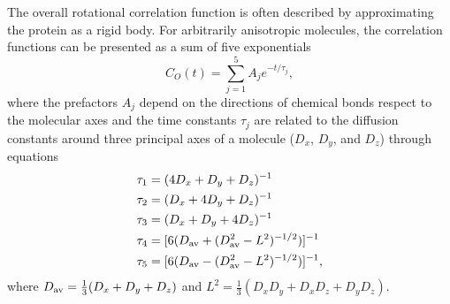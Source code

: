 \documentclass[journal=jpcbfk,manuscript=article]{achemso}
\providecommand{\DIFaddbegin}{} %
\providecommand{\DIFaddend}{} %
\providecommand{\DIFdelbegin}{} %
\providecommand{\DIFdelend}{} %
\begin{document}
The overall rotational correlation function is often described
by approximating the protein as a rigid body.
For arbitrarily anisotropic molecules, the correlation functions
can  be presented as a sum of five exponentials~\cite{woessner62,korzhnev01}
\begin{equation}\label{CORRFanisot}
  C_O(t)=\sum_{j=1}^5 A_j e^{-t/\tau_j},
\end{equation}
where the prefactors $A_j$ depend on the directions of chemical bonds 
respect to the molecular axes \cite{woessner62,luginbuhl97} and
the time constants $\tau_j$ are related 
to the diffusion constants around
three principal axes of a molecule
($D_{x}$, $D_{y}$, and $D_{z}$) through equations~\cite{woessner62,korzhnev01}
\begin{equation}\label{tauDIFFeq}
  \DIFdelbegin %
\DIFdelend \DIFaddbegin \begin{split}
  \tau_1&=(4D_{x}+D_{y}+D_{z})^{-1} \\
  \tau_2&=(D_{x}+4D_{y}+D_{z})^{-1} \\
  \tau_3&=(D_{x}+D_{y}+4D_{z})^{-1} \\
  \tau_4&=[6(D_{\rm av}+(D_{\rm av}^2-L^2)^{-1/2})]^{-1} \\
  \tau_5&=[6(D_{\rm av}-(D_{\rm av}^2-L^2)^{-1/2})]^{-1}, \\
  \end{split}
\DIFaddend \end{equation}
where $D_{\rm av}=\frac{1}{3}(D_{x}+D_{y}+D_{z})$ and 
$L^2=\frac{1}{3}(D_{x}D_{y}+D_{x}D_{z}+D_{y}D_{z})$.
\end{document}
